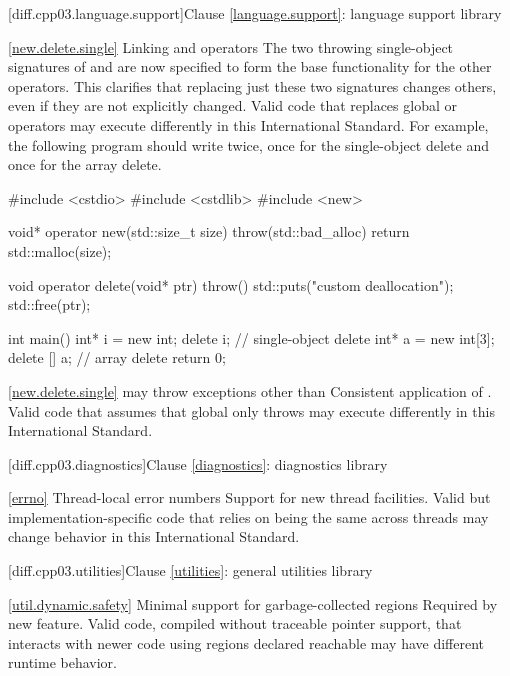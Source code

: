 [diff.cpp03.language.support]{Clause \ref{language.support}:
language support library}

\ref{new.delete.single}
\change Linking  and  operators
\rationale The two throwing single-object signatures of  and
 are now specified to form the base functionality for
the other operators. This clarifies that replacing just these two signatures
changes others, even if they are not explicitly changed.
\effect
Valid \CppIII code that replaces global  or 
operators may execute differently in this International Standard. For
example, the following program should write  twice,
once for the single-object delete and once for the array delete.

\begin{codeblock}
#include <cstdio>
#include <cstdlib>
#include <new>

void* operator new(std::size_t size) throw(std::bad_alloc) {
  return std::malloc(size);
}

void operator delete(void* ptr) throw() {
  std::puts("custom deallocation");
  std::free(ptr);
}

int main() {
  int* i = new int;
  delete i;                     // single-object delete
  int* a = new int[3];
  delete [] a;                  // array delete
  return 0;
}
\end{codeblock}

\ref{new.delete.single}
\change {} may throw exceptions other than
\rationale Consistent application of .
\effect
Valid \CppIII code that assumes that global  only
throws  may execute differently in this International
Standard.

[diff.cpp03.diagnostics]{Clause \ref{diagnostics}: diagnostics library}

\ref{errno}
\change Thread-local error numbers
\rationale Support for new thread facilities.
\effect Valid but implementation-specific \CppIII code that relies on
 being the same across threads may change behavior in this
International Standard.

[diff.cpp03.utilities]{Clause \ref{utilities}: general utilities library}

\ref{util.dynamic.safety}
\change Minimal support for garbage-collected regions
\rationale Required by new feature.
\effect
Valid \CppIII code, compiled without traceable pointer support,
that interacts with newer \Cpp code using regions declared reachable may
have different runtime behavior.

